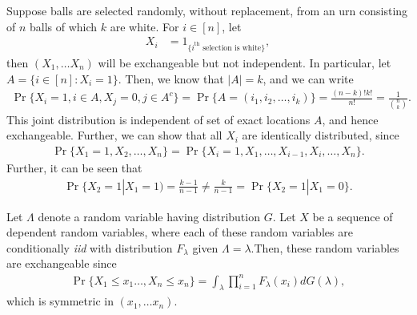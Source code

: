 \documentclass[a4paper,10pt,english]{article}
\begin{document}
\begin{shaded*}
\begin{exmp}
Suppose balls are selected randomly, without replacement, from an urn consisting of $n$ balls of which $k$ are white. For $i \in [n]$, let
\begin{align*}
   X_i &= 1_{\{ i^{\text{th}}\text{ selection is white}\}},
\end{align*}
then $(X_1, \ldots X_n)$ will be exchangeable but not independent.  
In particular, let $A = \{ i \in [n]: X_i = 1\}$. Then, we know that $|A| = k$, and we can write 
\begin{align*}
\Pr\{X_i = 1, i \in A, X_j = 0, j \in A^c\} = \Pr\{A = (i_1, i_2, \ldots, i_k) \} = \frac{(n-k)!k!}{n!} = \frac{1}{\binom{n}{k}}.
\end{align*}
This joint distribution is independent of set of exact locations $A$, and hence exchangeable. 
Further, we can show that all $X_i$ are identically distributed, since
\begin{align*}
\Pr\{X_1= 1, X_2, \ldots, X_n\} = \Pr\{X_i = 1, X_1, \ldots, X_{i-1}, X_i, \ldots, X_n\}. 
\end{align*}
Further, it can be seen that
\begin{align*}
\Pr\{X_2 = 1|X_1= 1) = \frac{k-1}{n-1} \neq \frac{k}{n-1} = \Pr\{X_2 = 1|X_1 =0\}.
\end{align*}
\end{exmp}
\begin{exmp}
Let $\Lambda$ denote a random variable having distribution $G$. Let $X$ be a sequence of dependent random variables, where each of these random variables are conditionally \textit{iid} with distribution $F_\lambda$ given $\Lambda= \lambda$.Then, these random variables are exchangeable since
\begin{align*}
\Pr\{X_1 \leq x_1 \ldots , X_n \leq x_n\} = \int_{\lambda} \prod_{i=1}^nF_\lambda(x_i)dG(\lambda),
\end{align*}
which is symmetric in $(x_1, \ldots x_n)$. %
\end{exmp}
\end{shaded*}
\end{document}
